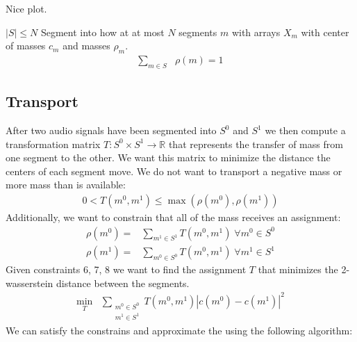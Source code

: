 \documentclass[12pt]{article}
\begin{document}
Nice plot.

$|S| \leq N$
Segment into how at at most $N$ segments $m$ with arrays $X_m$ 
with center of masses $c_m$ and masses $\rho_m$.
\begin{align}
  \sum_{m\in S} &\rho(m) = 1
\end{align}


\subsection{Transport}

After two audio signals have been segmented into $S^0$ and $S^1$
we then compute a transformation matrix
$T:S^0\times S^1\to \mathbb{R}$
that represents the transfer of mass from one segment to the other. 
We want this matrix to minimize the distance the centers of each segment move.
We do not want to transport a negative mass or more mass than is available:
\begin{align}
  0 < T(m^0, m^1) \leq \max(\rho(m^0), \rho(m^1))
\end{align}
Additionally, we want to constrain that all of the mass receives an assignment:
\begin{align}
  \rho(m^0) = &\sum_{m^1\in S^1} T(m^0, m^1)
  \;
  \forall m^0\in S^0
  \\
  \rho(m^1) = &\sum_{m^0\in S^0} T(m^0, m^1)
  \;
  \forall m^1\in S^1
\end{align}
Given constraints 6, 7, 8 we want to find the assignment $T$ that minimizes the 2-wasserstein distance between the segments.
\begin{align}
  \min_T &\sum_{\substack{m^0\in S^0\\ m^1\in S^1}} T(m^0, m^1)|c(m^0) - c(m^1)|^2
\end{align}
We can satisfy the constrains and approximate the using the following algorithm:
\end{document}
